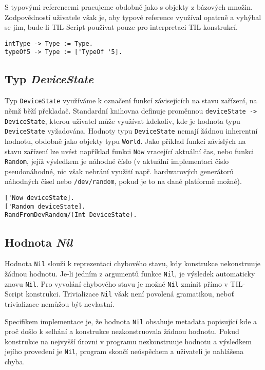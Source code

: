 S typovými referencemi pracujeme obdobně jako s objekty z bázových množin. Zodpovědností uživatele
však je, aby typové reference využíval opatrně a vyhýbal se jim, bude-li TIL-Script používat pouze
pro interpretaci TIL konstrukcí.

\begin{lstlisting}[caption={Příklad využití typových referencí}]
intType -> Type := Type.
typeOf5 -> Type := ['TypeOf '5].
\end{lstlisting}

\subsection{Typ \textit{DeviceState}}

Typ \lstinline{DeviceState} využíváme k označení funkcí závisejících na stavu zařízení, na němž
běží překladač. Standardní knihovna definuje proměnnou \lstinline{deviceState -> DeviceState},
kterou uživatel může využívat kdekoliv, kde je hodnota typu \lstinline{DeviceState} vyžadována.
Hodnoty typu \lstinline{DeviceState} nemají žádnou inherentní hodnotu, obdobně jako objekty typu
\lstinline{World}. Jako příklad funkcí závislých na stavu zařízení lze uvést například funkci
\lstinline{Now} vracející aktuální čas, nebo funkci \lstinline{Random}, jejíž výsledkem je náhodné
číslo (v aktuální implementaci číslo pseudonáhodné, nic však nebrání využití např. hardwarových
generátorů náhodných čísel nebo \lstinline{/dev/random}, pokud je to na dané platformě možné).

\begin{lstlisting}[caption={Příklad funkcí závislých na stavu zařízení}]
['Now deviceState].
['Random deviceState].
RandFromDevRandom/(Int DeviceState).
\end{lstlisting}

\subsection{Hodnota \textit{Nil}} \label{nil-value}

Hodnota \lstinline{Nil} slouží k reprezentaci chybového stavu, kdy konstrukce nekonstruuje žádnou
hodnotu. Je-li jedním z argumentů funkce \lstinline{Nil}, je výsledek automaticky znovu
\lstinline{Nil}. Pro vyvolání chybového stavu je možné \lstinline{Nil} zmínit přímo v TIL-Script
konstrukci. Trivializace \lstinline{Nil} však není povolená gramatikou, neboť trivializace nemůžou
být nevlastní.

Specifikem implementace je, že hodnota \lstinline{Nil} obsahuje metadata popisující kde a proč
došlo k selhání a konstrukce nezkonstruovala žádnou hodnotu. Pokud konstrukce na nejvyšší úrovni
v programu nezkonstruuje hodnotu a výsledkem jejího provedení je \lstinline{Nil}, program skončí
neúspěchem a uživateli je nahlášena chyba.

